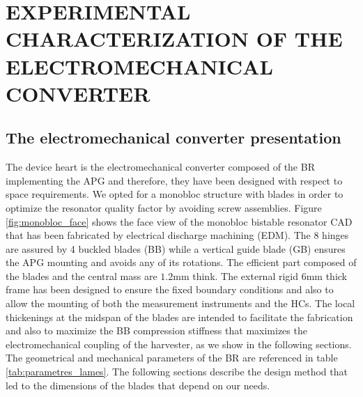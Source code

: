 \documentclass[3p,twocolumn,preprint]{elsarticle}
\begin{document}
\section{EXPERIMENTAL CHARACTERIZATION OF THE \mbox{ELECTROMECHANICAL} CONVERTER}
\label{sec:EXPERIMENTAL CHARACTERIZATIONS OF THE ELECTROMECHANICAL CONVERTER}
	\subsection{The electromechanical converter presentation}	
	\label{The electromechanical converter presentation}
The device heart is the electromechanical converter composed of the BR implementing the APG and therefore, they have been designed with respect to space requirements. We opted for a monobloc structure with blades in order to optimize the resonator quality factor by avoiding screw assemblies. Figure \ref{fig:monobloc_face} shows the face view of the monobloc bistable resonator CAD that has been fabricated by electrical discharge machining (EDM). The 8 hinges are assured by 4 buckled blades (BB) while a vertical guide blade (GB) ensures the APG mounting and avoids any of its rotations. The efficient part composed of the blades and the central mass are $1.2$mm think. The external rigid $6$mm thick frame has been designed to ensure the fixed boundary conditions and also to allow the mounting of both the measurement instruments and the HCs. The local thickenings at the midspan of the blades are intended to facilitate the fabrication and also to maximize the BB compression stiffness that maximizes the electromechanical coupling of the harvester, as we show in the following sections. The geometrical and mechanical parameters of the BR are referenced in table \ref{tab:parametres_lames}. The following sections describe the design method that led to the dimensions of the blades that depend on our needs.
\end{document}
